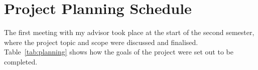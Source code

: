 %
%
%

\chapter{Project Planning Schedule}
\label{app:planning}

The first meeting with my advisor took place at the start of the second
semester, where the project topic and scope were discussed and finalised.
Table~\ref{tab:planning} shows how the goals of the project were set out to
be completed.

